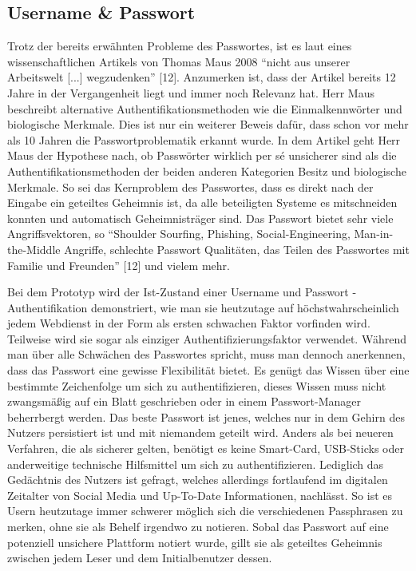 \subsection{Username \& Passwort}
Trotz der bereits erwähnten Probleme des Passwortes, ist es laut eines wissenschaftlichen Artikels von Thomas Maus 2008 ``nicht aus unserer Arbeitswelt [...] wegzudenken'' [12]. Anzumerken ist, dass der Artikel bereits 12 Jahre in der Vergangenheit liegt und immer noch Relevanz hat. Herr Maus beschreibt alternative Authentifikationsmethoden wie die Einmalkennwörter und biologische Merkmale. Dies ist nur ein weiterer Beweis dafür, dass schon vor mehr als 10 Jahren die Passwortproblematik erkannt wurde. In dem Artikel geht Herr Maus der Hypothese nach, ob Passwörter wirklich per sé unsicherer sind als die Authentifikationsmethoden der beiden anderen Kategorien Besitz und biologische Merkmale. So sei das Kernproblem des Passwortes, dass es direkt nach der Eingabe ein geteiltes Geheimnis ist, da alle beteiligten Systeme es mitschneiden konnten und automatisch Geheimnisträger sind. Das Passwort bietet sehr viele Angriffsvektoren, so ``Shoulder Sourfing, Phishing, Social-Engineering, Man-in-the-Middle Angriffe, schlechte Passwort Qualitäten, das Teilen des Passwortes mit Familie und Freunden'' [12] und vielem mehr.

Bei dem Prototyp wird der Ist-Zustand einer Username und Passwort - Authentifikation demonstriert, wie man sie heutzutage auf höchstwahrscheinlich jedem Webdienst in der Form als ersten schwachen Faktor vorfinden wird. Teilweise wird sie sogar als einziger Authentifizierungsfaktor verwendet. Während man über alle Schwächen des Passwortes spricht, muss man dennoch anerkennen, dass das Passwort eine gewisse Flexibilität bietet. Es genügt das Wissen über eine bestimmte Zeichenfolge um sich zu authentifizieren, dieses Wissen muss nicht zwangsmäßig auf ein Blatt geschrieben oder in einem Passwort-Manager beherrbergt werden. Das beste Passwort ist jenes, welches nur in dem Gehirn des Nutzers persistiert ist und mit niemandem geteilt wird. Anders als bei neueren Verfahren, die als sicherer gelten, benötigt es keine Smart-Card, USB-Sticks oder anderweitige technische Hilfsmittel um sich zu authentifizieren. Lediglich das Gedächtnis des Nutzers ist gefragt, welches allerdings fortlaufend im digitalen Zeitalter von Social Media und Up-To-Date Informationen, nachlässt. So ist es Usern heutzutage immer schwerer möglich sich die verschiedenen Passphrasen zu merken, ohne sie als Behelf irgendwo zu notieren. Sobal das Passwort auf eine potenziell unsichere Plattform notiert wurde, gillt sie als geteiltes Geheimnis zwischen jedem Leser und dem Initialbenutzer dessen.

